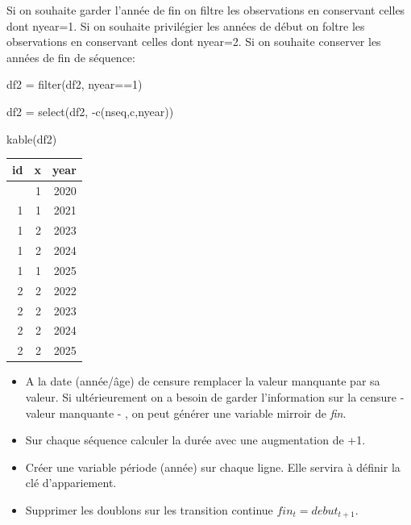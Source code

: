 \documentclass[
  12pt,
  letterpaper,
  DIV=11,
  numbers=noendperiod,
  onepage,
  openany]{scrreprt}
\newenvironment{Shaded}{\begin{snugshade}}{\end{snugshade}}
\newcommand{\DecValTok}[1]{\textcolor[rgb]{0.86,0.86,0.80}{#1}}
\newcommand{\FunctionTok}[1]{\textcolor[rgb]{0.94,0.94,0.56}{#1}}
\newcommand{\NormalTok}[1]{\textcolor[rgb]{0.80,0.80,0.80}{#1}}
\newcommand{\OtherTok}[1]{\textcolor[rgb]{0.94,0.94,0.56}{#1}}
\newcommand{\SpecialCharTok}[1]{\textcolor[rgb]{0.86,0.64,0.64}{#1}}
\providecommand{\tightlist}{%
  \setlength{\itemsep}{0pt}\setlength{\parskip}{0pt}}\usepackage{longtable,booktabs,array}
\begin{document}
Si on souhaite garder l'année de fin on filtre les observations en
conservant celles dont nyear=1. Si on souhaite privilégier les années de
début on foltre les observations en conservant celles dont nyear=2. Si
on souhaite conserver les années de fin de séquence:

\begin{Shaded}
\begin{Highlighting}[]
\NormalTok{df2 }\OtherTok{=} \FunctionTok{filter}\NormalTok{(df2, nyear}\SpecialCharTok{==}\DecValTok{1}\NormalTok{)}

\NormalTok{df2 }\OtherTok{=} \FunctionTok{select}\NormalTok{(df2, }\SpecialCharTok{{-}}\FunctionTok{c}\NormalTok{(nseq,c,nyear))}

\FunctionTok{kable}\NormalTok{(df2)}
\end{Highlighting}
\end{Shaded}

\begin{longtable}[]{@{}rrr@{}}
\toprule\noalign{}
id & x & year \\
\midrule\noalign{}
\endhead
\bottomrule\noalign{}
\endlastfoot
1 & 1 & 2020 \\
1 & 1 & 2021 \\
1 & 2 & 2023 \\
1 & 2 & 2024 \\
1 & 1 & 2025 \\
2 & 2 & 2022 \\
2 & 2 & 2023 \\
2 & 2 & 2024 \\
2 & 2 & 2025 \\
\end{longtable}

\begin{tcolorbox}[enhanced jigsaw, arc=.35mm, bottomrule=.15mm, titlerule=0mm, colbacktitle=quarto-callout-important-color!10!white, left=2mm, opacitybacktitle=0.6, toprule=.15mm, title=\textcolor{quarto-callout-important-color}{\faExclamation}\hspace{0.5em}{En résumé}, colframe=quarto-callout-important-color-frame, breakable, coltitle=black, opacityback=0, toptitle=1mm, bottomtitle=1mm, rightrule=.15mm, leftrule=.75mm, colback=white]

\begin{itemize}
\tightlist
\item
  A la date (année/âge) de censure remplacer la valeur manquante par sa
  valeur. Si ultérieurement on a besoin de garder l'information sur la
  censure - valeur manquante - , on peut générer une variable mirroir de
  \emph{fin}.
\item
  Sur chaque séquence calculer la durée avec une augmentation de +1.
\item
  Créer une variable période (année) sur chaque ligne. Elle servira à
  définir la clé d'appariement.
\item
  Supprimer les doublons sur les transition continue
  \(fin_t = debut_{t+1}\).
\end{itemize}

\end{tcolorbox}
\end{document}
